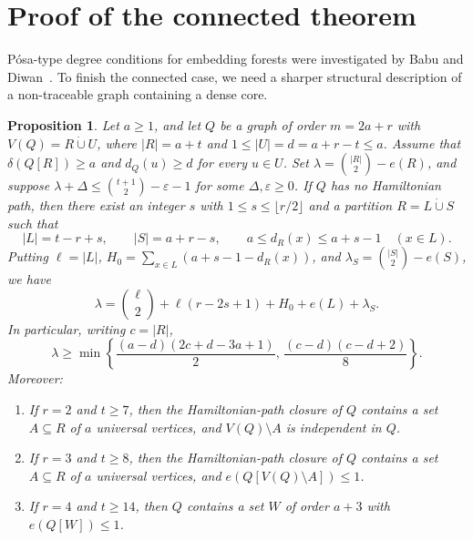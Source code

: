 \documentclass[10pt]{article}
\theoremstyle{compactplain}
\newtheorem{proposition}[theorem]{Proposition}
\theoremstyle{remark}\newtheorem{remark}[theorem]{Remark}
\begin{document}
\section{Proof of the connected theorem}\label{sec:connected}

P\'osa-type degree conditions for embedding forests were investigated by
Babu and Diwan~\cite{BabuDiwan}. To finish the connected case, we need a
sharper structural description of a non-traceable graph containing a
dense core.

\begin{proposition}\label{prop:posa-structure}
Let $a\ge1$, and let $Q$ be a graph of order $m=2a+r$ with
$V(Q)=R\dot\cup U$, where $|R|=a+t$ and $1\le|U|=d=a+r-t\le a$. Assume
that $\delta(Q[R])\ge a$ and $d_Q(u)\ge d$ for every $u\in U$. Set
$\lambda=\binom{|R|}{2}-e(R)$, and suppose
$\lambda+\Delta\le\binom{t+1}{2}-\varepsilon-1$ for some
$\Delta,\varepsilon\ge0$. If $Q$ has no Hamiltonian path, then there
exist an integer $s$ with $1\le s\le\lfloor r/2\rfloor$ and a partition
$R=L\dot\cup S$ such that
\[
 |L|=t-r+s,\qquad |S|=a+r-s,\qquad a\le d_R(x)\le a+s-1\quad(x\in L).
\]
Putting $\ell=|L|$, $H_0=\sum_{x\in L}(a+s-1-d_R(x))$, and
$\lambda_S=\binom{|S|}{2}-e(S)$, we have
\begin{equation}\label{eq:posa-count}
 \lambda=\binom{\ell}{2}+\ell(r-2s+1)+H_0+e(L)+\lambda_S.
\end{equation}
In particular, writing $c=|R|$,
\begin{equation}\label{eq:posa-endpoints}
 \lambda\ge\min\left\{
 \frac{(a-d)(2c+d-3a+1)}{2},\,
 \frac{(c-d)(c-d+2)}{8}\right\}.
\end{equation}
Moreover:
\begin{enumerate}
\item[(i)] If $r=2$ and $t\ge7$, then the Hamiltonian-path closure of
$Q$ contains a set $A\subseteq R$ of $a$ universal vertices, and
$V(Q)\setminus A$ is independent in $Q$.
\item[(ii)] If $r=3$ and $t\ge8$, then the Hamiltonian-path closure of
$Q$ contains a set $A\subseteq R$ of $a$ universal vertices, and
$e(Q[V(Q)\setminus A])\le1$.
\item[(iii)] If $r=4$ and $t\ge14$, then $Q$ contains a set $W$ of
order $a+3$ with $e(Q[W])\le1$.
\end{enumerate}
\end{proposition}
\end{document}

